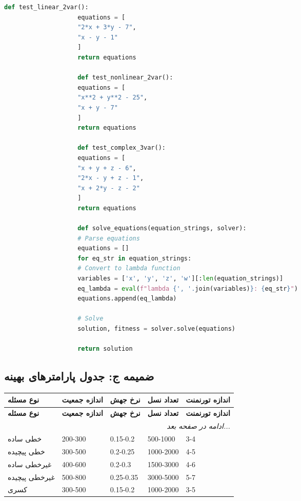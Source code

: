 \documentclass[12pt,a4paper]{article}
\newenvironment{ltrcode}{\lr\bgroup}{\egroup}
\begin{document}
			\begin{ltrcode}
				\begin{lstlisting}[language=Python, caption=توابع تست مختلف]
					def test_linear_2var():
					equations = [
					"2*x + 3*y - 7",
					"x - y - 1"
					]
					return equations
					
					def test_nonlinear_2var():
					equations = [
					"x**2 + y**2 - 25",
					"x + y - 7"
					]
					return equations
					
					def test_complex_3var():
					equations = [
					"x + y + z - 6",
					"2*x - y + z - 1", 
					"x + 2*y - z - 2"
					]
					return equations
					
					def solve_equations(equation_strings, solver):
					# Parse equations
					equations = []
					for eq_str in equation_strings:
					# Convert to lambda function
					variables = ['x', 'y', 'z', 'w'][:len(equation_strings)]
					eq_lambda = eval(f"lambda {', '.join(variables)}: {eq_str}")
					equations.append(eq_lambda)
					
					# Solve
					solution, fitness = solver.solve(equations)
					
					return solution
				\end{lstlisting}
			\end{ltrcode}
			
			\subsection{ضمیمه ج: جدول پارامترهای بهینه}
			
			\begin{center}
				\begin{longtable}{|p{3cm}|p{2cm}|p{2cm}|p{2cm}|p{3cm}|}
					\hline
					\textbf{نوع مسئله} & \textbf{اندازه جمعیت} & \textbf{نرخ جهش} & \textbf{تعداد نسل} & \textbf{اندازه تورنمنت} \\
					\hline
					\endfirsthead
					
					\hline
					\textbf{نوع مسئله} & \textbf{اندازه جمعیت} & \textbf{نرخ جهش} & \textbf{تعداد نسل} & \textbf{اندازه تورنمنت} \\
					\hline
					\endhead
					
					\hline
					\multicolumn{5}{r}{\textit{ادامه در صفحه بعد...}} \\
					\endfoot
					
					\hline
					\endlastfoot
					
					خطی ساده & 200-300 & 0.15-0.2 & 500-1000 & 3-4 \\
					\hline
					خطی پیچیده & 300-500 & 0.2-0.25 & 1000-2000 & 4-5 \\
					\hline
					غیرخطی ساده & 400-600 & 0.2-0.3 & 1500-3000 & 4-6 \\
					\hline
					غیرخطی پیچیده & 500-800 & 0.25-0.35 & 3000-5000 & 5-7 \\
					\hline
					کسری & 300-500 & 0.15-0.2 & 1000-2000 & 3-5 \\
					\hline
				\end{longtable}
			\end{center}
			
		
\end{document}
